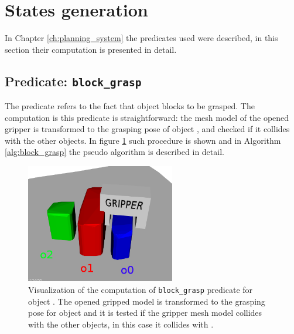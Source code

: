 \section{States generation}
In Chapter \ref{ch:planning_system}  the predicates used were described, in this section their computation is presented in detail. 

\subsection{Predicate: \texttt{block\_grasp}}
The  predicate refers to the fact that object  blocks  to be grasped. The computation is this predicate is straightforward: the mesh model of the opened gripper is transformed to the grasping pose of object , and checked if it collides with the other objects. In figure \ref{fig:block_grasp} such procedure is shown and in Algorithm \ref{alg:block_grasp} the pseudo algorithm is described in detail. 

\begin{figure}[tb]
\centering
\includegraphics[width=6.5cm]{Img/grasping/block_grasp.png}
\caption{Visualization of the computation of \texttt{block\_grasp} predicate for object . The opened gripped model is transformed to the grasping pose for object  and it is tested if the gripper mesh model collides with the other objects, in this case it collides with . }\label{fig:block_grasp}
\end{figure}

